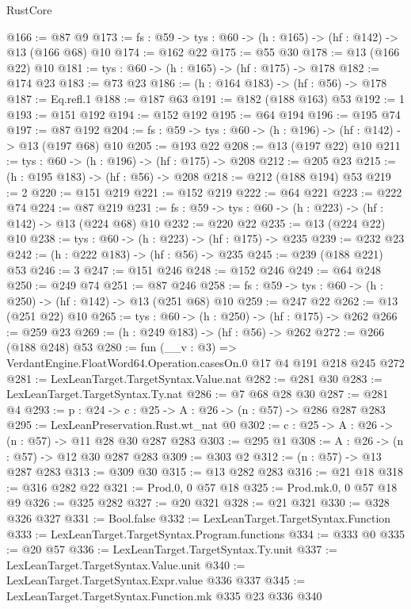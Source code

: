 \begin{lexlean}{RustCore}
\begin{coremodule}
@166 := @87 @9
@173 := {fs : @59} -> {tys : @60} -> (h : @165) -> (hf : @142) -> @13 (@166 @68) @10
@174 := @162 @22
@175 := @55 @30
@178 := @13 (@166 @22) @10
@181 := {tys : @60} -> (h : @165) -> (hf : @175) -> @178
@182 := @174 @23
@183 := @73 @23
@186 := (h : @164 @183) -> (hf : @56) -> @178
@187 := Eq.refl.{1}
@188 := @187 @63
@191 := @182 (@188 @163) @53
@192 := 1
@193 := @151 @192
@194 := @152 @192
@195 := @64 @194
@196 := @195 @74
@197 := @87 @192
@204 := {fs : @59} -> {tys : @60} -> (h : @196) -> (hf : @142) -> @13 (@197 @68) @10
@205 := @193 @22
@208 := @13 (@197 @22) @10
@211 := {tys : @60} -> (h : @196) -> (hf : @175) -> @208
@212 := @205 @23
@215 := (h : @195 @183) -> (hf : @56) -> @208
@218 := @212 (@188 @194) @53
@219 := 2
@220 := @151 @219
@221 := @152 @219
@222 := @64 @221
@223 := @222 @74
@224 := @87 @219
@231 := {fs : @59} -> {tys : @60} -> (h : @223) -> (hf : @142) -> @13 (@224 @68) @10
@232 := @220 @22
@235 := @13 (@224 @22) @10
@238 := {tys : @60} -> (h : @223) -> (hf : @175) -> @235
@239 := @232 @23
@242 := (h : @222 @183) -> (hf : @56) -> @235
@245 := @239 (@188 @221) @53
@246 := 3
@247 := @151 @246
@248 := @152 @246
@249 := @64 @248
@250 := @249 @74
@251 := @87 @246
@258 := {fs : @59} -> {tys : @60} -> (h : @250) -> (hf : @142) -> @13 (@251 @68) @10
@259 := @247 @22
@262 := @13 (@251 @22) @10
@265 := {tys : @60} -> (h : @250) -> (hf : @175) -> @262
@266 := @259 @23
@269 := (h : @249 @183) -> (hf : @56) -> @262
@272 := @266 (@188 @248) @53
@280 := fun (__v : @3) => VerdantEngine.FloatWord64.Operation.casesOn.{0} @17 @4 @191 @218 @245 @272
@281 := LexLeanTarget.TargetSyntax.Value.nat
@282 := @281 @30
@283 := LexLeanTarget.TargetSyntax.Ty.nat
@286 := @7 @68 @28 @30
@287 := @281 @4
@293 := {p : @24} -> {c : @25} -> {A : @26} -> (n : @57) -> @286 @287 @283
@295 := LexLeanPreservation.Rust.wt_nat @0
@302 := {c : @25} -> {A : @26} -> (n : @57) -> @11 @28 @30 @287 @283
@303 := @295 @1
@308 := {A : @26} -> (n : @57) -> @12 @30 @287 @283
@309 := @303 @2
@312 := (n : @57) -> @13 @287 @283
@313 := @309 @30
@315 := @13 @282 @283
@316 := @21 @18
@318 := @316 @282 @22
@321 := Prod.{0, 0} @57 @18
@325 := Prod.mk.{0, 0} @57 @18 @9
@326 := @325 @282
@327 := @20 @321
@328 := @21 @321
@330 := @328 @326 @327
@331 := Bool.false
@332 := LexLeanTarget.TargetSyntax.Function
@333 := LexLeanTarget.TargetSyntax.Program.functions
@334 := @333 @0
@335 := @20 @57
@336 := LexLeanTarget.TargetSyntax.Ty.unit
@337 := LexLeanTarget.TargetSyntax.Value.unit
@340 := LexLeanTarget.TargetSyntax.Expr.value @336 @337
@345 := LexLeanTarget.TargetSyntax.Function.mk @335 @23 @336 @340

\end{coremodule}
\end{lexlean}
